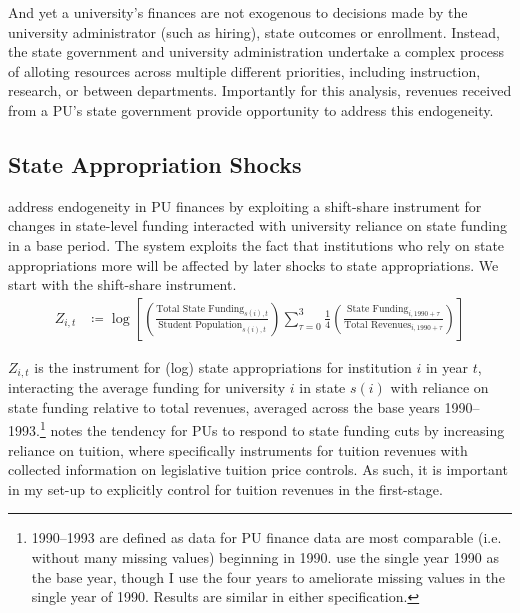 \documentclass[notitlepage,12pt]{article}
\begin{document}
And yet a university's finances are not exogenous to decisions made by the university administrator (such as hiring), state outcomes or enrollment.
Instead, the state government and university administration undertake a complex process of alloting resources across multiple different priorities, including instruction, research, or between departments.
Importantly for this analysis, revenues received from a  PU's state government provide opportunity to address this endogeneity.


\subsection{State Appropriation Shocks}
\label{sec:approp-shocks}

\cite{NBERw23736,chakrabarti2018effect,NBERw27885} address endogeneity in PU finances by exploiting a shift-share instrument for changes in state-level funding interacted with university reliance on state funding in a base period.
The system exploits the fact that institutions who rely on state appropriations more will be affected by later shocks to state appropriations.
We start with the shift-share instrument.
\begin{align}
    \label{eqn:public-instrument}
    Z_{i,t} &\coloneqq \log \left[
    \left( \frac{\text{Total State Funding}_{s(i),t}}{\text{Student Population}_{s(i),t}} \right)
    \sum_{\tau = 0}^{3} \frac 14
    \left( \frac{\text{State Funding}_{i,1990 + \tau}}{\text{Total Revenues}_{i,1990 + \tau}} \right) \right]
\end{align}

$Z_{i,t}$ is the instrument for (log) state appropriations for institution $i$ in year $t$, interacting the average funding for university $i$ in state $s(i)$ with reliance on state funding relative to total revenues, averaged across the base years 1990--1993.\footnote{
    1990--1993 are defined as data for PU finance data are most comparable (i.e. without many missing values) beginning in 1990.
    \cite{NBERw23736} use the single year 1990 as the base year, though I use the four years to ameliorate missing values in the single year of 1990.
    Results are similar in either specification.
}
\cite{NBERw27885} notes the tendency for PUs to respond to state funding cuts by increasing reliance on tuition, where \cite{NBERw23736} specifically instruments for tuition revenues with collected information on legislative tuition price controls.
As such, it is important in my set-up to explicitly control for tuition revenues in the first-stage.
\end{document}
